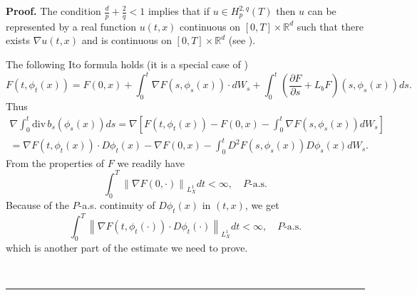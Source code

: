 \documentclass[a4paper,10pt]{article}
\newenvironment{proof}[1][Proof]{\textbf{#1.} }{\ \rule{0.5em}{0.5em}}
\begin{document}
\begin{proof} The condition $\frac {d}{p} + \frac{2}{q}
   <1$ implies that if $u \in H^{2,q}_p(T)$ then $u$
   can be represented by a real  function $u(t,x) $ continuous
    on $[0,T]
    \times \mathbb{R} ^d$ such that there exists $\nabla u(t,x)$
 and is continuous on $[0,T]
    \times \mathbb{R} ^d$ (see \cite[Lemma 10.1]{Kry-Ro}).

     The following Ito formula holds
     (it is a special case of  \cite[Theorem 3.7]{Kry-Ro})
\begin{equation} \label{ito}
F\left(  t,{\phi}_{t}\left(  x\right)  \right)  =F\left(
0,x\right) +\int_{0}^{t}\nabla F\left(  s,{\phi}_{s}\left(
x\right)  \right)  \cdot dW_{s}+\int_{0}^{t}\left(  \frac{\partial
F}{\partial s}+L_{b}F\right) \left(  s,{\phi}_{s}\left(  x\right)
\right)  ds.
\end{equation}
Thus
\begin{align*}
\nabla\int_{0}^{t}{\mathrm{div}\, }b_{s}\left(  {\phi}_{s}\left(
x\right) \right)  ds    =\nabla\left[  F\left(  t,{\phi}_{t}\left(
x\right)  \right) -F\left(  0,x\right)  -\int_{0}^{t}\nabla
F\left(  s,{\phi}_{s}\left(
x\right)  \right)  dW_{s}\right] \\
  =\nabla F\left(  t,{\phi}_{t}\left(  x\right)  \right)  \cdot D{\phi}%
_{t}\left(  x\right)  -\nabla F\left(  0,x\right)  -\int_{0}^{t}D^{2}F\left(
s,{\phi}_{s}\left(  x\right)  \right)  D{\phi}_{s}\left(  x\right)  dW_{s}.
\end{align*}
From the properties of $F$  we readily have
\[
\int_{0}^{T}\left\|  \nabla F\left(  0, \cdot \right)  \right\|
_{L_{X}^{1} }dt<\infty,\quad P\text{-a.s.}
\]
Because of the $P$-a.s. continuity of $D{\phi}_{t}\left(  x\right)
$ in $(  t,x)  $, we get
\[
\int_{0}^{T}\left\|  \nabla F\left(  t,{\phi}_{t}\left( \cdot
\right) \right) \cdot D{\phi}_{t}\left(  \cdot \right)  \right\|
_{L_{X}^{1}}dt<\infty,\quad
P\text{-a.s.}%
\]
which is another part of the estimate we need to prove.


\end{proof}
\end{document}
